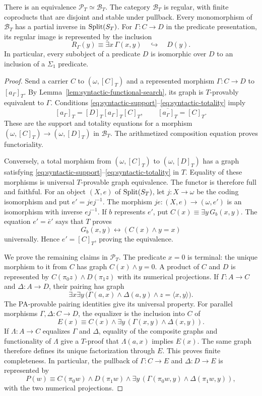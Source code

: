 \begin{lemma}\label{lem:syntactic-total-category}
There is an equivalence $\mathcal P_T\simeq\mathcal B_T$.
The category $\mathcal B_T$ is regular, with finite coproducts
that are disjoint and stable under pullback. Every monomorphism
of $\mathcal B_T$ has a partial inverse in $\operatorname{Split}(S_T)$.
For $\Gamma:C\to D$ in the predicate presentation, its regular
image is represented by the inclusion
\[
 R_\Gamma(y)\equiv\exists x\,\Gamma(x,y)
 \quad\hookrightarrow\quad D(y).
\]
In particular, every subobject of a predicate $D$ is isomorphic
over $D$ to an inclusion of a $\Sigma_1$ predicate.
\end{lemma}
\begin{proof}
Send a carrier $C$ to $(\omega,[C]_T)$ and a represented morphism
$\Gamma:C\to D$ to $[a_\Gamma]_T$. By
Lemma~\ref{lem:syntactic-functional-search}, its graph is
$T$-provably equivalent to $\Gamma$. Conditions
\eqref{eq:syntactic-support}--\eqref{eq:syntactic-totality} imply
\[
 [a_\Gamma]_T=[D]_T[a_\Gamma]_T[C]_T,
 \qquad\overline{[a_\Gamma]_T}=[C]_T.
\]
These are the support and totality equations for a morphism
$(\omega,[C]_T)\to(\omega,[D]_T)$ in $\mathcal B_T$.
The arithmetized composition equation proves functoriality.

Conversely, a total morphism from $(\omega,[C]_T)$ to
$(\omega,[D]_T)$ has a graph satisfying
\eqref{eq:syntactic-support}--\eqref{eq:syntactic-totality} in $T$.
Equality of these morphisms is universal $T$-provable graph
equivalence. The functor is therefore full and faithful.
For an object $(X,e)$ of $\operatorname{Split}(S_T)$, let $j:X\to\omega$ be
the coding isomorphism and put $e'=jej^{-1}$. The morphism
$je:(X,e)\to(\omega,e')$ is an isomorphism with inverse $ej^{-1}$.
If $b$ represents $e'$, put $C(x)\equiv\exists y\,G_b(x,y)$.
The equation $e'=\bar e'$ says that $T$ proves
\[
 G_b(x,y)\longleftrightarrow(C(x)\land y=x)
\]
universally. Hence $e'=[C]_T$, proving the equivalence.

We prove the remaining claims in $\mathcal P_T$.
The predicate $x=0$ is terminal: the unique morphism to it from
$C$ has graph $C(x)\land y=0$.
A product of $C$ and $D$ is represented by
$C(\pi_0z)\land D(\pi_1z)$ with its numerical projections.
If $\Gamma:A\to C$ and
$\Delta:A\to D$, their pairing has graph
\[
 \exists x\exists y\,
   \bigl(\Gamma(a,x)\land\Delta(a,y)\land z=\langle x,y\rangle\bigr).
\]
The PA-provable pairing identities give its universal property.
For parallel morphisms $\Gamma,\Delta:C\to D$, the equalizer is
the inclusion into $C$ of
\[
 E(x)\equiv C(x)\land
             \exists y\,(\Gamma(x,y)\land\Delta(x,y)).
\]
If $\Lambda:A\to C$ equalizes $\Gamma$ and $\Delta$,
equality of the composite graphs and functionality of $\Lambda$
give a $T$-proof that $\Lambda(a,x)$ implies $E(x)$.
The same graph therefore defines its unique factorization through
$E$. This proves finite completeness. In particular, the pullback
of $\Gamma:C\to E$ and $\Delta:D\to E$ is represented by
\[
 P(w)\equiv C(\pi_0w)\land D(\pi_1w)\land
       \exists y\,(\Gamma(\pi_0w,y)\land\Delta(\pi_1w,y)),
\]
with the two numerical projections.


\end{proof}
